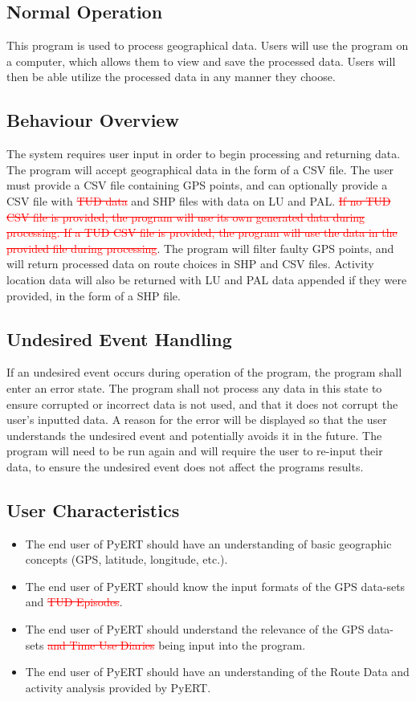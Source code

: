 \documentclass[12pt, titlepage]{article}
\begin{document}
\subsection{Normal Operation}
This program is used to process geographical data. Users will use the program on a computer, which allows them to view and save the processed data. Users will then be able utilize the processed data in any manner they choose.
\subsection{Behaviour Overview}
The system requires user input in order to begin processing and returning data. The program will accept geographical data in the form of a CSV file. The user must provide a CSV file containing GPS points, and can optionally provide a CSV file with \textcolor{red}{\sout{TUD data}} and SHP files with data on LU and PAL.  \textcolor{red}{\sout{If no TUD CSV file is provided, the program will use its own generated data during processing. If a TUD CSV file is provided, the program will use the data in the provided file during processing}}. The program will filter faulty GPS points, and will return processed data on route choices in SHP and CSV files. Activity location data will also be returned with LU and PAL data appended if they were provided, in the form of a SHP file.
\subsection{Undesired Event Handling}
If an undesired event occurs during operation of the program, the program shall enter an error state. The program shall not process any data in this state to ensure corrupted or incorrect data is not used, and that it does not corrupt the user's inputted data. A reason for the error will be displayed so that the user understands the undesired event and potentially avoids it in the future. The program will need to be run again and will require the user to re-input their data, to ensure the undesired event does not affect the programs results.
\subsection{User Characteristics}
\begin{itemize}
    \item The end user of PyERT should have an understanding of basic geographic concepts (GPS, latitude, longitude, etc.).
    \item The end user of PyERT should know the input formats of the GPS data-sets and  \textcolor{red}{\sout{TUD Episodes}}.
    \item The end user of PyERT should understand the relevance of the GPS data-sets \textcolor{red}{\sout{and Time Use Diaries}} being input into the program.
    \item The end user of PyERT should have an understanding of the Route Data and activity analysis provided by PyERT.
\end{itemize}
\end{document}
